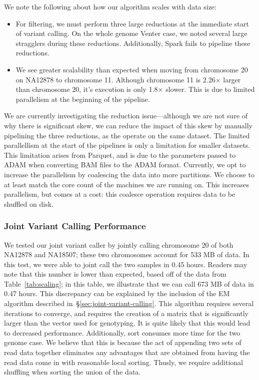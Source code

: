 \documentclass{acm_proc_article-sp}
\begin{document}
We note the following about how our algorithm scales with data size:

\begin{itemize}
\item For filtering, we must perform three large reductions at the immediate start of variant calling. On the whole genome Venter case,
we noted several large stragglers during these reductions. Additionally, Spark fails to pipeline these reductions.
\item We see greater scalability than expected when moving from chromosome 20 on NA12878 to chromosome 11. Although
chromosome 11 is 2.26$\times$ larger than chromosome 20, it's execution is only 1.8$\times$ slower. This is due to limited parallelism
at the beginning of the pipeline.
\end{itemize}

We are currently investigating the reduction issue---although we are not sure of why there is significant skew, we can reduce the impact
of this skew by manually pipelining the three reductions, as the operate on the same dataset. The limited parallellism at the start of
the pipelines is only a limitation for smaller datasets. This limitation arises from Parquet, and is due to the parameters passed to
ADAM when converting BAM files to the ADAM format. Currently, we opt to increase the parallelism by coalescing the data into
more partitions. We choose to at least match the core count of the machines we are running on. This increases parallelism, but comes
at a cost: this coalesce operation requires data to be shuffled on disk.

\subsubsection{Joint Variant Calling Performance}
\label{sec:jvc-performance}

We tested our joint variant caller by jointly calling chromosome 20 of both NA12878 and NA18507; these two chromosomes account
for 533 MB of data. In this test, we were able to joint call the two samples in 0.45 hours. Readers may note that this number is lower
than expected, based off of the data from Table~\ref{tab:scaling}; in this table, we illustrate that we can call 673 MB of data in 0.47 hours.
This discrepancy can be explained by the inclusion of the EM algorithm described in~\S\ref{sec:joint-variant-calling}. This algorithm requires
several iterations to converge, and requires the creation of a matrix that is significantly larger than the vector used for genotyping. It is quite likely
that this would lead to decreased performance. Additionally, sort consumes more time for the two genome case. We believe that this is because
the act of appending two sets of read data together eliminates any advantages that are obtained from having the read data come in with
reasonable local sorting. Thusly, we require additional shuffling when sorting the union of the data.
\end{document}
